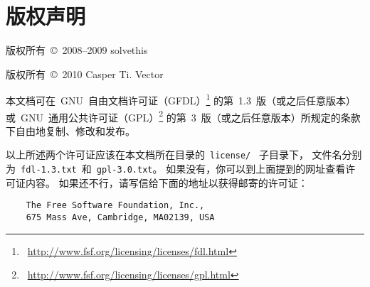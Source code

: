 \cleardoublepage
\chapter*{\textbf{版权声明}}
{
\begin{comment}
	任何收存和保管本论文各种版本的单位和个人，
	未经本论文作者同意，不得将本论文转借他人，
	亦不得随意复制、抄录、拍照或以任何方式传播。
	否则一旦引起有碍作者著作权之问题，将可能承担法律责任。
\end{comment}
	版权所有~\copyright~2008--2009 solvethis
	\par
	版权所有~\copyright~2010 Casper Ti. Vector
	\vspace{0.75em}\par
	本文档可在~GNU~自由文档许可证（GFDL）\footnote%
	{\ \url{http://www.fsf.org/licensing/licenses/fdl.html}}%
	的第~1.3~版（或之后任意版本）或~GNU~通用公共许可证（GPL）\footnote%
	{\ \url{http://www.fsf.org/licensing/licenses/gpl.html}}%
	的第~3~版（或之后任意版本）所规定的条款下自由地复制、修改和发布。
	
	以上所述两个许可证应该在本文档所在目录的~\verb|license/|~%
	\linebreak[1]子目录下，
	文件名分别为~\verb|fdl-1.3.txt|~和~\verb|gpl-3.0.txt|。
	如果没有，你可以到上面提到的网址查看许可证内容。
	如果还不行，请写信给下面的地址以获得邮寄的许可证：
\begin{verbatim}
    The Free Software Foundation, Inc.,
    675 Mass Ave, Cambridge, MA02139, USA 
\end{verbatim}
	\par
}

